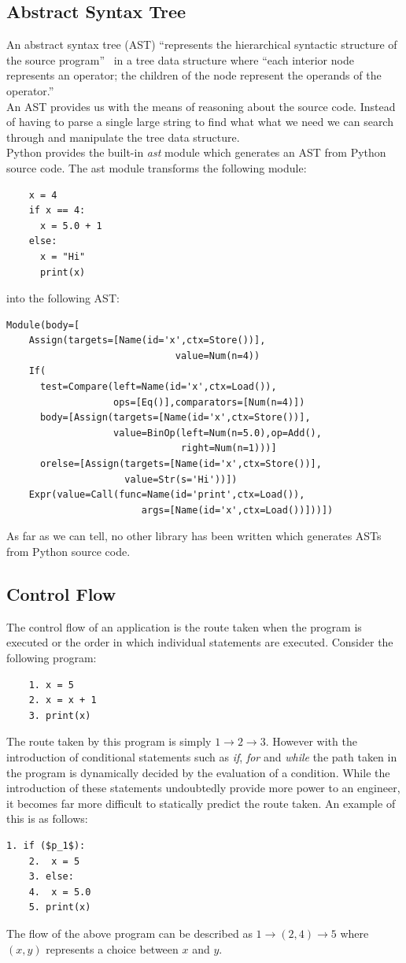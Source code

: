 \documentclass[12pt, titlepage]{article}
\begin{document}
\subsection{Abstract Syntax Tree}
An abstract syntax tree (AST) ``represents the hierarchical syntactic structure of the source 
program''~\cite{dragonBook} in a tree data structure where ``each 
interior node represents an operator; the children of the node represent the 
operands of the operator.''~\cite{dragonBook} \\
An AST provides us with the means of reasoning about the source code. Instead of having to parse a single large string to find what what we need we can search through and manipulate the tree data structure. \\
Python provides the built-in \textit{ast} module which generates an AST from Python source code. The ast module transforms the following module:
\begin{lstlisting}
    x = 4
    if x == 4:
      x = 5.0 + 1
    else:
      x = "Hi"
      print(x)
\end{lstlisting}
into the following AST:
\begin{verbatim}
Module(body=[
    Assign(targets=[Name(id='x',ctx=Store())],
                              value=Num(n=4))
    If(
      test=Compare(left=Name(id='x',ctx=Load()),
                   ops=[Eq()],comparators=[Num(n=4)])
      body=[Assign(targets=[Name(id='x',ctx=Store())],
                   value=BinOp(left=Num(n=5.0),op=Add(),
                               right=Num(n=1)))]
      orelse=[Assign(targets=[Name(id='x',ctx=Store())],
                     value=Str(s='Hi'))])
    Expr(value=Call(func=Name(id='print',ctx=Load()),
                        args=[Name(id='x',ctx=Load())]))])
\end{verbatim}
As far as we can tell, no other library has been written which generates ASTs from Python source code.

\subsection{Control Flow}
The control flow of an application is the route taken when the program is executed or the order in which individual statements are executed. Consider the following program:
\begin{lstlisting}
	1. x = 5
	2. x = x + 1
	3. print(x)
\end{lstlisting}
The route taken by this program is simply $1 \rightarrow 2 \rightarrow 3$. However with the introduction of conditional statements such as \textit{if}, \textit{for} and \textit{while} the path taken in the program is dynamically decided by the evaluation of a condition. While the introduction of these statements undoubtedly provide more power to an engineer, it becomes far more difficult to statically predict the route taken. An example of this is as follows:
\begin{lstlisting}[mathescape]
	1. if ($p_1$):
	2. 	x = 5
	3. else:
	4. 	x = 5.0
	5. print(x)
\end{lstlisting}
The flow of the above program can be described as $1 \rightarrow (2, 4) \rightarrow 5$ where $(x, y)$ represents a choice between $x$ and $y$.
\end{document}
